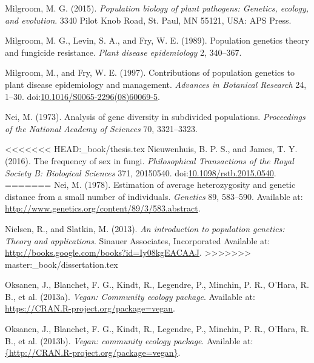 \documentclass[double,12pt]{beavtex}
\begin{document}
  \hypertarget{ref-milgroom2015population}{}
  Milgroom, M. G. (2015). \emph{Population biology of plant pathogens:
  Genetics, ecology, and evolution}. 3340 Pilot Knob Road, St. Paul, MN
  55121, USA: APS Press.
  
  \hypertarget{ref-milgroom1989population}{}
  Milgroom, M. G., Levin, S. A., and Fry, W. E. (1989). Population
  genetics theory and fungicide resistance. \emph{Plant disease
  epidemiology} 2, 340--367.
  
  \hypertarget{ref-milgroom1997contributions}{}
  Milgroom, M., and Fry, W. E. (1997). Contributions of population
  genetics to plant disease epidemiology and management. \emph{Advances in
  Botanical Research} 24, 1--30.
  doi:\href{https://doi.org/10.1016/S0065-2296(08)60069-5}{10.1016/S0065-2296(08)60069-5}.
  
  \hypertarget{ref-nei1973analysis}{}
  Nei, M. (1973). Analysis of gene diversity in subdivided populations.
  \emph{Proceedings of the National Academy of Sciences} 70, 3321--3323.
  
<<<<<<< HEAD:_book/thesis.tex
  \hypertarget{ref-nieuwenhuis2016frequency}{}
  Nieuwenhuis, B. P. S., and James, T. Y. (2016). The frequency of sex in
  fungi. \emph{Philosophical Transactions of the Royal Society B:
  Biological Sciences} 371, 20150540.
  doi:\href{https://doi.org/10.1098/rstb.2015.0540}{10.1098/rstb.2015.0540}.
=======
  \hypertarget{ref-Nei:1978}{}
  Nei, M. (1978). Estimation of average heterozygosity and genetic
  distance from a small number of individuals. \emph{Genetics} 89,
  583--590. Available at:
  \url{http://www.genetics.org/content/89/3/583.abstract}.
  
  \hypertarget{ref-nielsen2013introduction}{}
  Nielsen, R., and Slatkin, M. (2013). \emph{An introduction to population
  genetics: Theory and applications}. Sinauer Associates, Incorporated
  Available at: \url{http://books.google.com/books?id=Iy08kgEACAAJ}.
>>>>>>> master:_book/dissertation.tex
  
  \hypertarget{ref-oksanen2013vegan}{}
  Oksanen, J., Blanchet, F. G., Kindt, R., Legendre, P., Minchin, P. R.,
  O'Hara, R. B., et al. (2013a). \emph{Vegan: Community ecology package}.
  Available at: \url{https://CRAN.R-project.org/package=vegan}.
  
  \hypertarget{ref-vegan}{}
  Oksanen, J., Blanchet, F. G., Kindt, R., Legendre, P., Minchin, P. R.,
  O'Hara, R. B., et al. (2013b). \emph{Vegan: community ecology package}.
  Available at:
  \href{\%7Bhttp://CRAN.R-project.org/package=vegan\%7D}{\{http://CRAN.R-project.org/package=vegan\}}.
  
\end{document}
